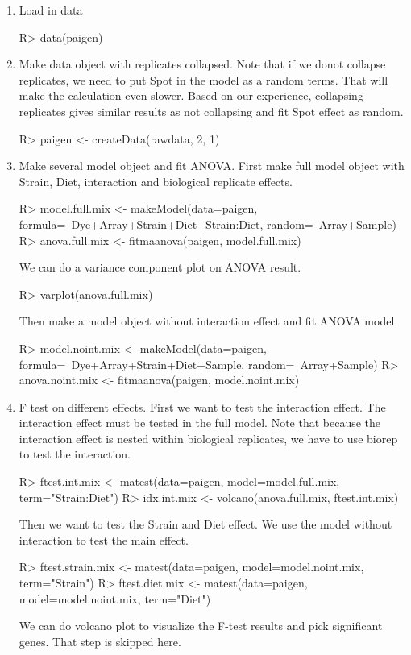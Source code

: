 \begin{enumerate}
\item Load in data 
\begin{Sinput}
R> data(paigen)
\end{Sinput}

\item Make data object with replicates collapsed. Note that
if we donot collapse replicates, we need to put Spot in the 
model as a random terms. That will make the calculation 
even slower. Based on our experience, collapsing replicates
gives similar results as not collapsing and fit Spot effect
as random.
\begin{Sinput}
R> paigen <- createData(rawdata, 2, 1)
\end{Sinput}

\item Make several model object and fit ANOVA. 
First make full model object with Strain, Diet, 
interaction and biological replicate effects.
\begin{Sinput}
R> model.full.mix <- makeModel(data=paigen,
     formula=~Dye+Array+Strain+Diet+Strain:Diet,
     random=~Array+Sample)
R> anova.full.mix <- fitmaanova(paigen, model.full.mix)
\end{Sinput}
We can do a variance component plot on ANOVA result.
\begin{Sinput}
R> varplot(anova.full.mix)
\end{Sinput}
Then make a model object without interaction effect and fit ANOVA model
\begin{Sinput}
R> model.noint.mix <- makeModel(data=paigen, 
   formula=~Dye+Array+Strain+Diet+Sample, random=~Array+Sample)
R> anova.noint.mix <- fitmaanova(paigen, model.noint.mix)
\end{Sinput}

\item F test on different effects. 
First we want to test the interaction effect. 
The interaction effect must be tested in the full model. Note that because the
interaction effect is nested within biological replicates, we have to use
biorep to test the interaction.
\begin{Sinput}
R> ftest.int.mix <- matest(data=paigen, model=model.full.mix, 
          term="Strain:Diet")
R> idx.int.mix <- volcano(anova.full.mix, ftest.int.mix)
\end{Sinput}
Then we want to test the Strain and Diet effect. 
We use the model without interaction
to test the main effect.
\begin{Sinput}
R> ftest.strain.mix <- matest(data=paigen, model=model.noint.mix, 
          term="Strain")
R> ftest.diet.mix <- matest(data=paigen, model=model.noint.mix, 
          term="Diet")
\end{Sinput}
We can do volcano plot to visualize the F-test results and pick significant
genes. That step is skipped here.


\end{enumerate}
